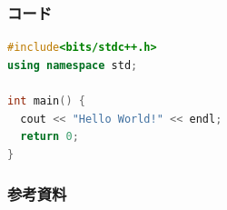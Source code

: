 \documentclass[unicode, 14pt, aspectratio=169]{beamer}
\begin{document}
\begin{frame}[fragile]
\frametitle{コード}
  {\small 
    \begin{lstlisting}[language=C++]
#include<bits/stdc++.h>
using namespace std;

int main() {
  cout << "Hello World!" << endl;
  return 0;
}
    \end{lstlisting}
}
\end{frame}

\begin{frame}[allowframebreaks]
  \frametitle{参考資料}
  \printbibliography
  \nocite{*} 
\end{frame}
\end{document}
